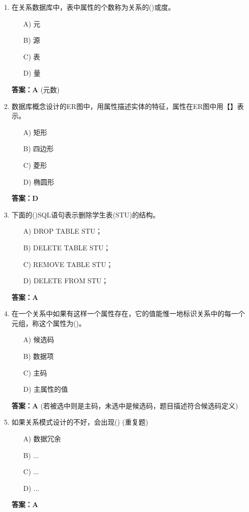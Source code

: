 \documentclass[a4paper,12pt]{article}
\begin{document}
\begin{enumerate}[label=\arabic*.]
\item 在关系数据库中，表中属性的个数称为关系的()或度。
\begin{itemize}
    \item[A)] 元
    \item[B)] 源
    \item[C)] 表
    \item[D)] 量
\end{itemize}
\textbf{答案：A} (元数)

\item 数据库概念设计的ER图中，用属性描述实体的特征，属性在ER图中用【】表示。
\begin{itemize}
    \item[A)] 矩形
    \item[B)] 四边形
    \item[C)] 菱形
    \item[D)] 椭圆形
\end{itemize}
\textbf{答案：D}

\item 下面的()SQL语句表示删除学生表(STU)的结构。
\begin{itemize}
    \item[A)] DROP TABLE STU；
    \item[B)] DELETE TABLE STU；
    \item[C)] REMOVE TABLE STU；
    \item[D)] DELETE FROM STU；
\end{itemize}
\textbf{答案：A}

\item 在一个关系中如果有这样一个属性存在，它的值能惟一地标识关系中的每一个元组，称这个属性为()。
\begin{itemize}
    \item[A)] 候选码
    \item[B)] 数据项
    \item[C)] 主码
    \item[D)] 主属性的值
\end{itemize}
\textbf{答案：A} (若被选中则是主码，未选中是候选码，题目描述符合候选码定义)

\item 如果关系模式设计的不好，会出现() (重复题)
\begin{itemize}
    \item[A)] 数据冗余
    \item[B)] ...
    \item[C)] ...
    \item[D)] ...
\end{itemize}
\textbf{答案：A}


\end{enumerate}
\end{document}
